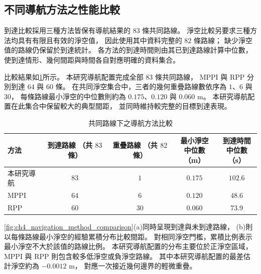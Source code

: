 \subsection{不同導航方法之性能比較}
\label{subsec:navigation_method_performance}

到達比較採用三種方法皆保有導航結果的 $83$ 條共同路線。
淨空比較另要求三種方法均具有有限且有效的淨空值，
因此使用其中資料完整的 $82$ 條路線；
缺少淨空值的路線仍保留於到達統計。
各方法的到達時間則由其已到達路線計算中位數，
使到達情形、幾何間距與時間各自對應明確的資料集合。

比較結果如\cref{tab:ch4_navigation_method_results}所示。
本研究導航配置完成全部 $83$ 條共同路線，
MPPI 與 RPP 分別到達 $64$ 與 $60$ 條。
在共同淨空集合中，三者的幾何重疊路線數依序為 $1$、$6$ 與 $30$，
每條路線最小淨空的中位數則約為 $0.175$、$0.120$ 與 $0.060$ m。
本研究導航配置在此集合中保留較大的典型間距，
並同時維持較完整的目標到達表現。

\begin{table}[htbp]
    \centering
    \caption{共同路線下之導航方法比較}
    \label{tab:ch4_navigation_method_results}
    \begingroup
    \small
    \setlength{\tabcolsep}{4pt}
    \renewcommand{\arraystretch}{1.25}
    \begin{tabular}{l c c c c}
        \hline
        方法
        & \shortstack{到達路線\\（共 $83$ 條）}
        & \shortstack{重疊路線\\（共 $82$ 條）}
        & \shortstack{最小淨空\\中位數（m）}
        & \shortstack{到達時間\\中位數（s）} \\
        \hline
        本研究導航 & $83$ & $1$  & $0.175$ & $102.6$ \\
        MPPI       & $64$ & $6$  & $0.120$ & $48.6$  \\
        RPP        & $60$ & $30$ & $0.060$ & $73.9$  \\
        \hline
    \end{tabular}
    \endgroup
\end{table}

\cref{fig:ch4_navigation_method_comparison}(a)同時呈現到達與未到達路線，
(b)則以每條路線最小淨空的經驗累積分布比較間距。
對相同淨空門檻，累積比例表示最小淨空不大於該值的路線比例。
本研究導航配置的分布主要位於正淨空區域，
MPPI 與 RPP 則包含較多低淨空或負淨空路線。
其中本研究導航配置的最差估計淨空約為 $-0.0012$ m，
對應一次接近幾何邊界的輕微重疊。

